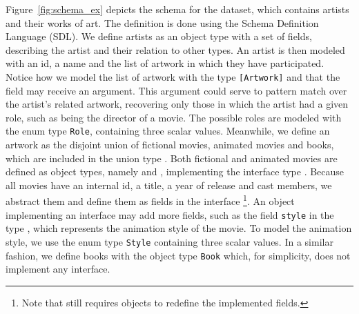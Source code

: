 Figure~\ref{fig:schema_ex} depicts the schema for the \goodbois dataset, which contains
artists and their works of art. The definition is done using the \gql Schema Definition Language (SDL).
We define artists as an object type with a set of fields, describing the artist and their relation
to other types. An artist is then modeled with an id, a name and the list of artwork
in which they have participated. Notice how we model the list of artwork with the type 
\texttt{[Artwork]} and that the field may receive an argument. 
This argument could serve to pattern match over the artist's related artwork, 
recovering only those in which the artist had a given role, such as being the director of a movie. 
The possible roles are modeled with the enum type \texttt{Role}, containing three scalar values.
Meanwhile, we define an artwork as the disjoint union of fictional movies, animated movies and books,
which are included in the union type \artwork.
Both fictional and animated movies are defined as object types, namely \fiction and 
\animation, implementing the interface type \movies. 
Because all movies have an internal id, a title, a year of release and cast members, we 
abstract them and define them as fields in the interface \movies\footnote{Note that \gql still requires objects to redefine the implemented fields.}.
An object implementing an interface may add more fields, such as the field \texttt{style} in the type \animation, which
represents the animation style of the movie. 
To model the animation style, we use the enum type \texttt{Style} containing
three scalar values. 
In a similar fashion, we define books with the object type \texttt{Book} which, for simplicity, 
does not implement any interface.

